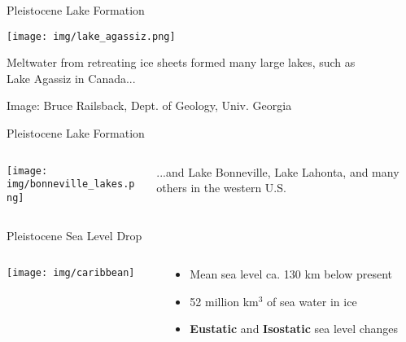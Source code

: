 \documentclass[xcolor=svgnames]{beamer}
\begin{document}
\begin{frame}{Pleistocene Lake Formation}
		\begin{center}
			\texttt{[image: img/lake\_agassiz.png]}
			\begin{block}{}
				Meltwater from retreating ice sheets formed many large lakes, such as \\
				Lake Agassiz in Canada...
			\end{block}
		\end{center}
		{\hfill\tiny{Image: Bruce Railsback, Dept. of Geology, Univ. Georgia}}
\end{frame}

\begin{frame}{Pleistocene Lake Formation}
	\begin{columns}
		\begin{column}{0.5\textwidth}
			\begin{center}
				\texttt{[image: img/bonneville\_lakes.png]}
			\end{center}
		\end{column}
		\begin{column}{0.45\textwidth}
			\begin{block}{}
			...and Lake Bonneville, Lake Lahonta, and many others in the western U.S.
			\end{block}
		\end{column}
	\end{columns}
\end{frame}

\begin{frame}{Pleistocene Sea Level Drop}
		\begin{columns}[T]
			\begin{column}{0.45\textwidth}
				\texttt{[image: img/caribbean]}
			\end{column}
			\begin{column}{0.45\textwidth}
				\begin{itemize}
					\item Mean sea level ca. 130 km below present
					\item 52 million km$^3$ of sea water in ice
					\item \textcolor{myBlue}{\textbf{Eustatic}} and \textcolor{myBlue}{\textbf{Isostatic}} sea level changes
				\end{itemize}
			\end{column}
		\end{columns}
\end{frame}
\end{document}
